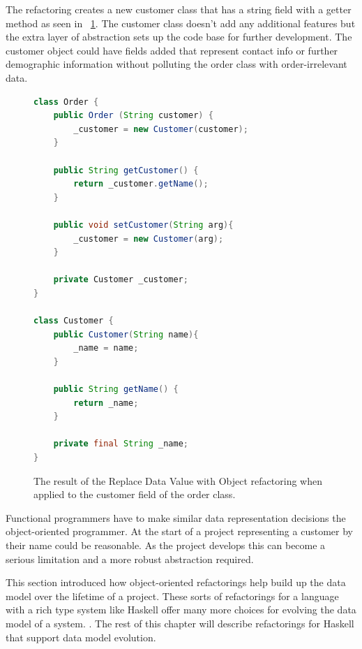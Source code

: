 The refactoring creates a new customer class that has a string field with a getter method as seen in \DIFdelbegin {}\DIFdelend \DIFaddbegin {}\DIFaddend ~\ref{custCls}. The customer class doesn't add any additional features but the extra layer of abstraction \DIFaddbegin {}\DIFaddend sets up the code base for further development. The customer object could have fields added that represent contact info or further demographic information without polluting the order class with order-irrelevant data.

\begin{figure}[t]
\begin{lstlisting}[language = java,tabsize=4]
class Order {
	public Order (String customer) {
		_customer = new Customer(customer);	
	}

	public String getCustomer() {
		return _customer.getName();
	}

	public void setCustomer(String arg){
		_customer = new Customer(arg);	
	}

	private Customer _customer;
}

class Customer {
	public Customer(String name){
		_name = name;
	}

	public String getName() {
		return _name;
	}

	private final String _name;
}
\end{lstlisting}
\caption{The result of the Replace Data Value with Object refactoring when applied to the customer field of the order class.}
\label{custCls}
\end{figure}

Functional programmers have to make similar data representation decisions \DIFdelbegin {}\DIFdelend \DIFaddbegin {}\DIFaddend the object-oriented programmer. At the start of a project representing a customer \DIFdelbegin {}\DIFdelend by their name could be reasonable. As the project develops this can become a serious limitation and a more robust abstraction \DIFdelbegin {}\DIFdelend \DIFaddbegin {}\DIFaddend required. 

This section introduced how object-oriented refactorings help build up the data model over the lifetime of a project. \DIFdelbegin {}\DIFdelend These sorts of refactorings for a language with a rich type system like Haskell offer many more choices for evolving the data model of a system. \DIFdelbegin {}\DIFdelend \DIFaddbegin {}\texttt{} \texttt{} \DIFaddend . The rest of this chapter will describe refactorings for Haskell that support data model evolution.  

